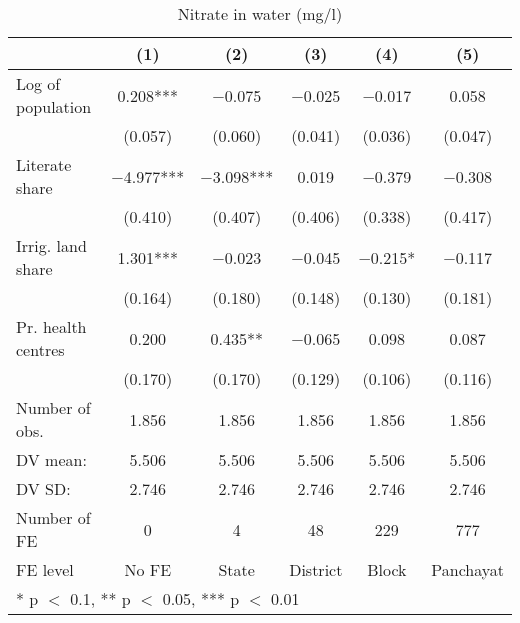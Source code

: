 \begin{table}

\caption{\label{tab:}Nitrate in water (mg/l)}
\centering
\begin{tabular}[t]{lccccc}
\toprule
  & (1) & (2) & (3) & (4) & (5)\\
\midrule
Log of population & \num{0.208}*** & \num{-0.075} & \num{-0.025} & \num{-0.017} & \num{0.058}\\
 & (\num{0.057}) & (\num{0.060}) & (\num{0.041}) & (\num{0.036}) & (\num{0.047})\\
Literate share & \num{-4.977}*** & \num{-3.098}*** & \num{0.019} & \num{-0.379} & \num{-0.308}\\
 & (\num{0.410}) & (\num{0.407}) & (\num{0.406}) & (\num{0.338}) & (\num{0.417})\\
Irrig. land share & \num{1.301}*** & \num{-0.023} & \num{-0.045} & \num{-0.215}* & \num{-0.117}\\
 & (\num{0.164}) & (\num{0.180}) & (\num{0.148}) & (\num{0.130}) & (\num{0.181})\\
Pr. health centres & \num{0.200} & \num{0.435}** & \num{-0.065} & \num{0.098} & \num{0.087}\\
 & (\num{0.170}) & (\num{0.170}) & (\num{0.129}) & (\num{0.106}) & (\num{0.116})\\
\midrule
Number of obs. & \num{1,856} & \num{1,856} & \num{1,856} & \num{1,856} & \num{1,856}\\
DV mean: & \num{5.506} & \num{5.506} & \num{5.506} & \num{5.506} & \num{5.506}\\
DV SD: & \num{2.746} & \num{2.746} & \num{2.746} & \num{2.746} & \num{2.746}\\
Number of FE & \num{0} & \num{4} & \num{48} & \num{229} & \num{777}\\
FE level & No FE & State & District & Block & Panchayat\\
\bottomrule
\multicolumn{6}{l}{\rule{0pt}{1em}* p $<$ 0.1, ** p $<$ 0.05, *** p $<$ 0.01}\\
\end{tabular}
\end{table}
